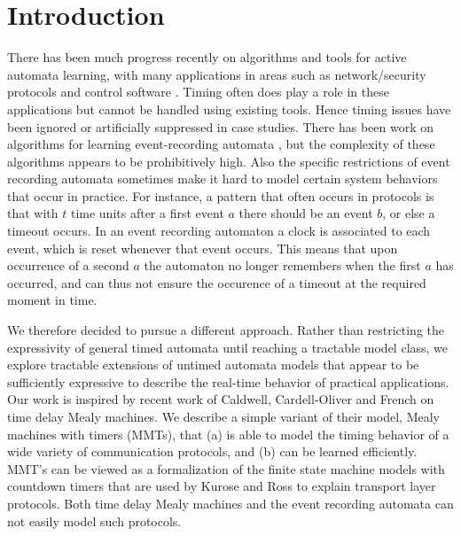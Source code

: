 \section{Introduction}
\label{sec:intro}

There has been much progress recently on algorithms and tools for active automata learning, with many
applications in areas such as network/security protocols and control software \cite{Vaa17}.
Timing often does play a role in these applications but cannot be handled using existing tools. Hence
timing issues have been ignored or artificially suppressed in case studies.
There has been work on algorithms for learning event-recording automata \cite{GrinchteinJL10},
but the complexity of these algorithms appears to be prohibitively high.
Also the specific restrictions of event recording automata sometimes make it hard to model
certain system behaviors that occur in practice.
For instance, a pattern that often occurs in protocols is that with $t$ time units after a first event $a$
there should be an event $b$, or else a timeout occurs.
In an event recording automaton a clock is associated to each event, which is reset whenever that event occurs.
This means that upon occurrence of a second $a$ the automaton no longer remembers when the first $a$ has occurred,
and can thus not ensure the occurence of a timeout at the required moment in time.

We therefore decided to pursue a different approach. Rather than restricting the expressivity of general timed automata
until reaching a tractable model class, we explore tractable extensions of untimed automata models that appear to
be sufficiently expressive to describe the real-time behavior of practical applications.
%
Our work is inspired by recent work of Caldwell, Cardell-Oliver and French \cite{CCF16} on time delay Mealy machines.
We describe a simple variant of their model, Mealy machines with timers (MMTs), that 
(a) is able to model the timing behavior of a wide variety of communication protocols, and
(b) can be learned efficiently.
MMT's can be viewed as a formalization of the finite state machine models with countdown timers that are used by
Kurose and Ross \cite{KR13} to explain transport layer protocols.
Both time delay Mealy machines \cite{CCF16} and the event recording automata \cite{GrinchteinJL10} can not easily model such protocols.


